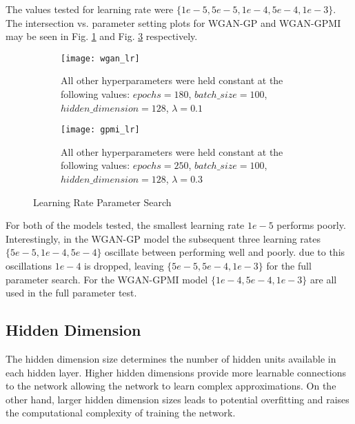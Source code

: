 The values tested for learning rate were $\{1e-5, 5e-5, 1e-4, 5e-4, 1e-3\}$. The intersection vs. parameter setting plots for WGAN-GP and WGAN-GPMI may be seen in Fig. \ref{fig:wgan_lr} and Fig. \ref{fig:gpmi_lr} respectively.

\begin{figure}[!htbp]
	\centering
	\begin{subfigure}{.7\textwidth}
		\texttt{[image: wgan\_lr]}
	\end{subfigure}%
	\begin{subfigure}{.3\textwidth}
		\caption{
			All other hyperparameters were held constant at the following values: $epochs=180$, $batch\_size = 100$, $hidden\_dimension=128$, $\lambda=0.1$
		}
		\label{fig:wgan_lr}
	\end{subfigure}%

	\begin{subfigure}{.7\textwidth}
		\texttt{[image: gpmi\_lr]}
	\end{subfigure}%
	\begin{subfigure}{.3\textwidth}
		\caption{
			All other hyperparameters were held constant at the following values: $epochs=250$, $batch\_size=100$, $hidden\_dimension=128$, $\lambda=0.3$
		}
		\label{fig:gpmi_lr}
	\end{subfigure}%
	\caption{Learning Rate Parameter Search}
\end{figure}

For both of the models tested, the smallest learning rate $1e-5$ performs poorly. Interestingly, in the WGAN-GP model the subsequent three learning rates $\{5e-5,1e-4,5e-4\}$ oscillate between performing well and poorly. due to this oscillations $1e-4$ is dropped, leaving $\{5e-5,5e-4,1e-3\}$ for the full parameter search. For the WGAN-GPMI model $\{1e-4, 5e-4, 1e-3\}$ are all used in the full parameter test.


\subsection{Hidden Dimension}
\label{sec:hdim}

The hidden dimension size determines the number of hidden units available in each hidden layer. Higher hidden dimensions provide more learnable connections to the network allowing the network to learn complex approximations. On the other hand, larger hidden dimension sizes leads to potential overfitting and raises the computational complexity of training the network.

